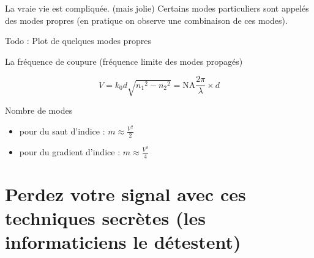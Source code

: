 \documentclass[aspectratio=149, 10pt, t]{beamer}
\begin{document}
\begin{frame}{La vraie vie est compliquée. (mais jolie)}
    Certains modes particuliers sont appelés des modes propres (en pratique on observe une combinaison de ces modes).

     Todo : Plot de quelques modes propres
    
    La fréquence de coupure (fréquence limite des modes propagés)
    
    $$V=k_0d\sqrt{{n_1}^2-{n_2}^2} = \text{NA}\frac{2\pi}{\lambda}\times d$$
    
    Nombre de modes \begin{itemize}
        \item pour du saut d'indice : $m \approx \frac{V^2}{2}$
        \item pour du gradient d'indice : $m\approx\frac{V^2}{4}$
    \end{itemize}
\end{frame}

\section{Perdez votre signal avec ces techniques secrètes (les informaticiens le détestent)}
\end{document}
